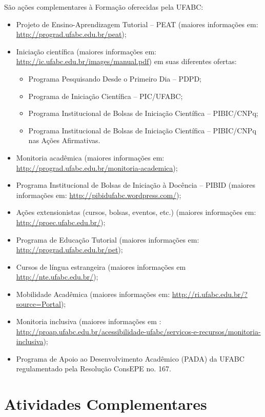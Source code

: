\documentclass{article}
\begin{document}
São ações complementares à Formação oferecidas pela UFABC:
\begin{itemize}
	\item Projeto de Ensino-Aprendizagem Tutorial – PEAT (maiores informações em: \url{http://prograd.ufabc.edu.br/peat});
	\item Iniciação científica (maiores informações em: \url{http://ic.ufabc.edu.br/images/manual.pdf}) em suas diferentes ofertas: 
	\begin{itemize}
		\item Programa Pesquisando Desde o Primeiro Dia – PDPD;
		\item Programa de Iniciação Científica – PIC/UFABC;
		\item Programa Institucional de Bolsas de Iniciação Científica – PIBIC/CNPq;
		\item Programa Institucional de Bolsas de Iniciação Científica – PIBIC/CNPq nas Ações Afirmativas.
		
	\end{itemize}
	\item Monitoria acadêmica (maiores informações em: \url{http://prograd.ufabc.edu.br/monitoria-academica});
	\item Programa Institucional de Bolsas de Iniciação à Docência – PIBID (maiores informações em: \url{http://pibidufabc.wordpress.com/});
	\item Ações extensionistas (cursos, bolsas, eventos, etc.) (maiores informações em: \url{http://proec.ufabc.edu.br/});
	\item Programa de Educação Tutorial (maiores informações em: \url{http://prograd.ufabc.edu.br/pet});
	\item Cursos de língua estrangeira (maiores informações em \url{http://nte.ufabc.edu.br/});
	\item Mobilidade Acadêmica (maiores informações em: \url{http://ri.ufabc.edu.br/?source=Portal});
	\item Monitoria inclusiva (maiores informações em : \url{http://proap.ufabc.edu.br/acessibilidade-ufabc/servicos-e-recursos/monitoria-inclusiva});
	\item Programa de Apoio ao Desenvolvimento Acadêmico (PADA) da UFABC regulamentado pela Resolução ConsEPE no. 167.
	
\end{itemize}



\newpage
\section {Atividades Complementares}
\end{document}
